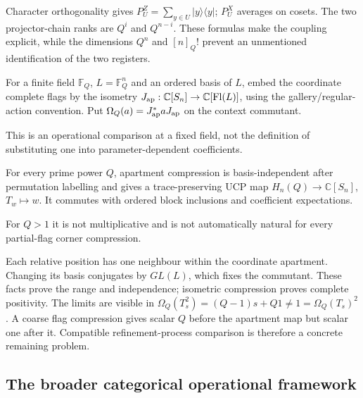 Character orthogonality gives $P_U^Z=\sum_{y\in U}|y\rangle\langle y|$;
$P_U^X$ averages on cosets. The two projector-chain ranks are $Q^i$ and
$Q^{n-i}$. These formulas make the coupling explicit, while the dimensions
$Q^n$ and $[n]_Q!$ prevent an unmentioned identification of the two registers.

\begin{definition}
For a finite field $\mathbb F_Q$, $L=\mathbb F_Q^n$ and an ordered basis of $L$, embed the coordinate
complete flags by the isometry $J_{\rm ap}:\mathbb C[S_n]\to
\mathbb C[\operatorname{Fl}(L)]$, using the gallery/regular-action convention.
Put $\Omega_Q(a)=J_{\rm ap}^*aJ_{\rm ap}$ on the context commutant.
\end{definition}
\begin{scope}This is an operational comparison at a fixed field, not
the definition of substituting one into parameter-dependent coefficients.\end{scope}

\begin{proposition}
{\normalfont\statusSketch}\quad For every prime power $Q$, apartment
compression is basis-independent after permutation labelling and gives
a trace-preserving UCP map $H_n(Q)\to\mathbb C[S_n]$, $T_w\mapsto w$.
It commutes with ordered block inclusions and coefficient expectations.
\end{proposition}
\begin{scope}For $Q>1$ it is not multiplicative and is not automatically
natural for every partial-flag corner compression.\end{scope}

Each relative position has one neighbour within the coordinate apartment.
Changing its basis conjugates by $GL(L)$, which fixes the commutant.
These facts prove the range and independence; isometric compression proves
complete positivity. The limits are visible in
$\Omega_Q(T_s^2)=(Q-1)s+Q1\ne1=\Omega_Q(T_s)^2$.
A coarse flag compression gives scalar $Q$ before the apartment map
but scalar one after it. Compatible refinement-process comparison is
therefore a concrete remaining problem.

\subsection{The broader categorical operational framework}

